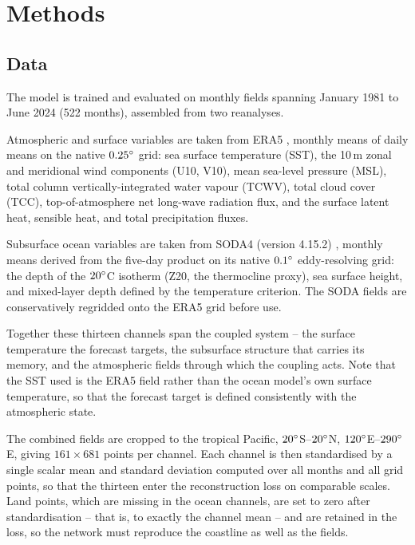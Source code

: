 \section{Methods}
\label{sec:methods}

\subsection{Data}
\label{sec:data}

The model is trained and evaluated on monthly fields spanning January 1981 to June 2024
(522 months), assembled from two reanalyses.

Atmospheric and surface variables are taken from ERA5 \citep{Hersbach2020}, monthly means of
daily means on the native $0.25^{\circ}$ grid: sea surface temperature (SST), the 10\,m zonal and
meridional wind components (U10, V10), mean sea-level pressure (MSL), total column
vertically-integrated water vapour (TCWV), total cloud cover (TCC), top-of-atmosphere net
long-wave radiation flux, and the surface latent heat, sensible heat, and total precipitation
fluxes.

Subsurface ocean variables are taken from SODA4 (version 4.15.2)
\citep{Chepurin2025}, monthly means derived from the five-day product on its native
$0.1^{\circ}$ eddy-resolving grid: the depth of the $20^{\circ}$C isotherm (Z20, the thermocline
proxy), sea surface height, and mixed-layer depth defined by the temperature criterion. The
SODA fields are conservatively regridded onto the ERA5 grid before use.

Together these thirteen channels span the coupled system -- the surface temperature the
forecast targets, the subsurface structure that carries its memory, and the atmospheric fields
through which the coupling acts. Note that the SST used is the ERA5 field rather than the
ocean model's own surface temperature, so that the forecast target is defined consistently with
the atmospheric state.

The combined fields are cropped to the tropical Pacific, $20^{\circ}$S--$20^{\circ}$N,
$120^{\circ}$E--$290^{\circ}$E, giving $161\times681$ points per channel. Each channel is then
standardised by a single scalar mean and standard deviation computed over all months and all
grid points, so that the thirteen enter the reconstruction loss on comparable scales. Land
points, which are missing in the ocean channels, are set to zero after standardisation -- that
is, to exactly the channel mean -- and are retained in the loss, so the network must reproduce
the coastline as well as the fields.


